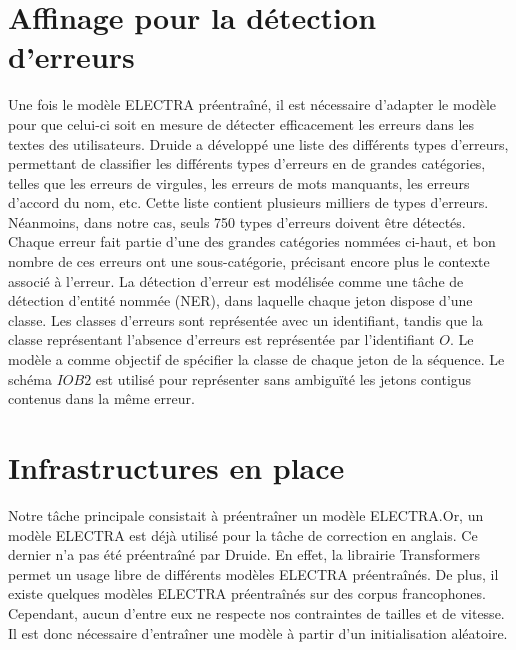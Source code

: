 \documentclass[12pt,twoside,rapport]{dms}
\theoremstyle{definition}
\numberwithin{equation}{section}
\numberwithin{table}{chapter}
\numberwithin{figure}{chapter}
\begin{document}
\section{Affinage pour la détection d'erreurs}
Une fois le modèle ELECTRA préentraîné, il est nécessaire d'adapter le modèle
pour que celui-ci soit en mesure de détecter efficacement les erreurs dans les
textes des utilisateurs. Druide a développé une liste des différents types
d'erreurs, permettant de classifier les différents types d'erreurs en de
grandes catégories, telles que les erreurs de virgules, les erreurs de mots
manquants, les erreurs d'accord du nom, etc. Cette liste contient plusieurs
milliers de types d'erreurs. Néanmoins, dans notre cas, seuls 750 types
d'erreurs doivent être détectés. Chaque erreur fait partie d'une des grandes
catégories nommées ci-haut, et bon nombre de ces erreurs ont une
sous-catégorie, précisant encore plus le contexte associé à l'erreur. La
détection d'erreur est modélisée comme une tâche de détection d'entité nommée
(NER), dans laquelle chaque jeton dispose d'une classe. Les classes d'erreurs
sont représentée avec un identifiant, tandis que la classe représentant
l'absence d'erreurs est représentée par l'identifiant $O$. Le modèle a comme
objectif de spécifier la classe de chaque jeton de la séquence. Le schéma
$IOB2$ \cite{schemas} est utilisé pour représenter sans ambiguïté les jetons
contigus contenus dans la même erreur.

\section{Infrastructures en place}
Notre tâche principale consistait à préentraîner un modèle ELECTRA.\@ Or, un
modèle ELECTRA est déjà utilisé pour la tâche de correction en anglais. Ce
dernier n'a pas été préentraîné par Druide. En effet, la librairie
Transformers\cite{wolf-etal-2020-transformers} permet un usage libre de
différents modèles ELECTRA préentraînés. De plus, il existe quelques modèles
ELECTRA préentraînés sur des corpus francophones. Cependant, aucun d'entre eux
ne respecte nos contraintes de tailles et de vitesse. Il est donc nécessaire
d'entraîner une modèle à partir d'un initialisation aléatoire.
\\
\end{document}
